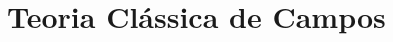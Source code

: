 \documentclass[twoside]{amsart}
\numberwithin{equation}{section}
\begin{document}


\section{Teoria Clássica de Campos}




\end{document}
